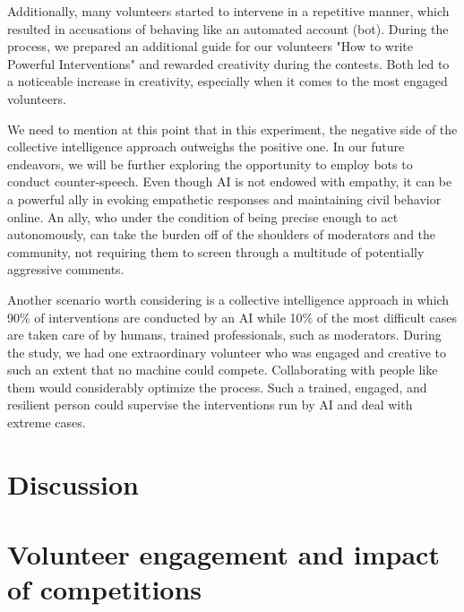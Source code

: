 \documentclass[preprint,12pt]{elsarticle}
\begin{document}
Additionally, many volunteers started to intervene in a repetitive manner, which resulted in accusations of behaving like an automated account (bot). During the process, we prepared an additional guide for our volunteers "How to write Powerful Interventions" and rewarded creativity during the contests. Both led to a noticeable increase in creativity, especially when it comes to the most engaged volunteers. 

We need to mention at this point that in this experiment, the negative side of the collective intelligence approach outweighs the positive one. In our future endeavors, we will be further exploring the opportunity to employ bots to conduct counter-speech. Even though AI is not endowed with empathy, it can be a powerful ally in evoking empathetic responses and maintaining civil behavior online. An ally, who under the condition of being precise enough to act autonomously, can take the burden off of the shoulders of moderators and the community, not requiring them to  screen through a multitude of potentially aggressive comments.

Another scenario worth considering is a collective intelligence approach in which 90\% of interventions are conducted by an AI while 10\% of the most difficult cases are taken care of by humans, trained professionals, such as moderators. During the study, we had one extraordinary volunteer who was engaged and creative to such an extent that no machine could compete. Collaborating with people like them would considerably optimize the process. Such a trained, engaged, and resilient person could supervise the interventions run by AI and deal with  extreme cases.









\section{Discussion}














\section{Volunteer engagement and impact of competitions}
\end{document}
